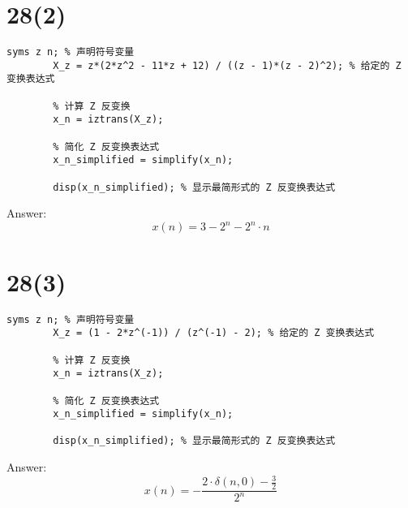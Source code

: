 \documentclass{article}
\begin{document}
    \section*{28(2)}
    \begin{lstlisting}[caption={题27(2) MATLAB代码}, label={lst:matlab}]
        syms z n; % 声明符号变量
        X_z = z*(2*z^2 - 11*z + 12) / ((z - 1)*(z - 2)^2); % 给定的 Z 变换表达式

        % 计算 Z 反变换
        x_n = iztrans(X_z);

        % 简化 Z 反变换表达式
        x_n_simplified = simplify(x_n);

        disp(x_n_simplified); % 显示最简形式的 Z 反变换表达式

    \end{lstlisting}
    Answer:
    \[x\left( n \right) = 3 - {2^n} - {2^n} \cdot n\]
    \section*{28(3)}
    \begin{lstlisting}[caption={题27(2) MATLAB代码}, label={lst:matlab}]
        syms z n; % 声明符号变量
        X_z = (1 - 2*z^(-1)) / (z^(-1) - 2); % 给定的 Z 变换表达式

        % 计算 Z 反变换
        x_n = iztrans(X_z);

        % 简化 Z 反变换表达式
        x_n_simplified = simplify(x_n);

        disp(x_n_simplified); % 显示最简形式的 Z 反变换表达式

    \end{lstlisting}
    Answer:
    \[x\left( n \right) =  - \frac{{2 \cdot \delta \left( {n,0} \right) - \frac{3}{2}}}{{{2^n}}}\]
\end{document}

